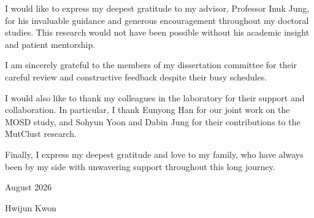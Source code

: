 I would like to express my deepest gratitude to my advisor, Professor Inuk Jung, for his invaluable guidance and generous encouragement throughout my doctoral studies. This research would not have been possible without his academic insight and patient mentorship.

I am sincerely grateful to the members of my dissertation committee for their careful review and constructive feedback despite their busy schedules.

I would also like to thank my colleagues in the laboratory for their support and collaboration. In particular, I thank Eunyong Han for our joint work on the MOSD study, and Sohyun Yoon and Dabin Jung for their contributions to the MutClust research.

Finally, I express my deepest gratitude and love to my family, who have always been by my side with unwavering support throughout this long journey.

\vspace{2em}
\hfill August 2026

\hfill Hwijun Kwon
